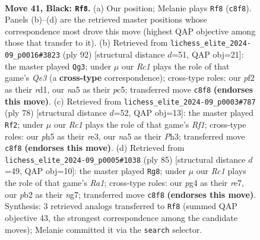 \documentclass[11pt]{article}
\begin{document}
\clearpage

\begin{figure}[p]\centering
\begin{subfigure}{0.46\textwidth}\centering
\resizebox{\linewidth}{!}{%
\newchessgame
\chessboard[
  setfen={2r3k1/6rp/8/Np5P/3Q2P1/8/PP3PK1/3R4 b - - 0 41},
  showmover=false,
  pgfstyle=straightmove, color=movearrow, markmove={c8-f8}
]}
\caption{}
\end{subfigure}\hfill
\begin{subfigure}{0.46\textwidth}\centering
\resizebox{\linewidth}{!}{%
\newchessgame
\chessboard[
  setfen={6k1/5p2/3q2p1/2p5/8/pP2Q2P/6RK/3r4 w - - 2 47},
  showmover=false,
  pgfstyle=straightmove, color=movearrow, markmove={e3-g3}
]}
\caption{}
\end{subfigure}
\\[4pt]
\begin{subfigure}{0.46\textwidth}\centering
\resizebox{\linewidth}{!}{%
\newchessgame
\chessboard[
  setfen={3Q4/1kp5/1q4p1/p4p2/8/4r2P/6P1/5RK1 w - - 2 40},
  showmover=false,
  pgfstyle=straightmove, color=movearrow, markmove={f1-f2}
]}
\caption{}
\end{subfigure}\hfill
\begin{subfigure}{0.46\textwidth}\centering
\resizebox{\linewidth}{!}{%
\newchessgame
\chessboard[
  setfen={r6k/4R1Nn/p7/1p6/5p1Q/7P/5PPK/8 b - - 1 43},
  showmover=false,
  pgfstyle=straightmove, color=movearrow, markmove={a8-g8}
]}
\caption{}
\end{subfigure}
\caption{\textbf{Move 41, Black: \texttt{Rf8}.} (a) Our position; Melanie plays \texttt{Rf8} (\texttt{c8f8}). Panels (b)--(d) are the retrieved master positions whose correspondence most drove this move (highest QAP objective among those that transfer to it). (b) Retrieved from \texttt{lichess\_elite\_2024-09\_p0016\#3823} (ply 92) [structural distance $d$=51, QAP obj=21]: the master played \texttt{Qg3}; under $\mu$ our \emph{Rc1} plays the role of that game's \emph{Qe3} (a \textbf{cross-type} correspondence); cross-type roles: our \emph{p}f2 as their \emph{r}d1, our \emph{n}a5 as their \emph{p}c5; transferred move \texttt{c8f8} \textbf{(endorses this move)}. (c) Retrieved from \texttt{lichess\_elite\_2024-09\_p0003\#787} (ply 78) [structural distance $d$=52, QAP obj=13]: the master played \texttt{Rf2}; under $\mu$ our \emph{Rc1} plays the role of that game's \emph{Rf1}; cross-type roles: our \emph{p}h5 as their \emph{r}e3, our \emph{n}a5 as their \emph{P}h3; transferred move \texttt{c8f8} \textbf{(endorses this move)}. (d) Retrieved from \texttt{lichess\_elite\_2024-09\_p0005\#1038} (ply 85) [structural distance $d$=49, QAP obj=10]: the master played \texttt{Rg8}; under $\mu$ our \emph{Rc1} plays the role of that game's \emph{Ra1}; cross-type roles: our \emph{p}g4 as their \emph{r}e7, our \emph{p}b2 as their \emph{n}g7; transferred move \texttt{c8f8} \textbf{(endorses this move)}. Synthesis: 3 retrieved analogs transferred to \texttt{Rf8} (summed QAP objective 43, the strongest correspondence among the candidate moves); Melanie committed it via the \texttt{search} selector.}
\label{fig:thought-m81}
\end{figure}
\end{document}
